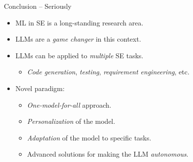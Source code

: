 \documentclass[presentation, 10pt]{beamer}\mode<presentation>{\usetheme{AMSBolognaFC}}
\begin{document}
\begin{frame}{Conclusion -- Seriously}
\begin{itemize}
	\item ML in SE is a long-standing research area.
	\item LLMs are a \emph{game changer} in this context.
	\item LLMs can be applied to \emph{multiple} SE tasks.
	\begin{itemize}
		\item \emph{Code generation}, \emph{testing}, \emph{requirement engineering}, etc.
	\end{itemize}
	\item Novel paradigm:
	\begin{itemize}
		\item \emph{One-model-for-all} approach.
		\item \emph{Personalization} of the model.
		\item \emph{Adaptation} of the model to specific tasks.
		\item Advanced solutions for making the LLM \emph{autonomous}.
	\end{itemize}
\end{itemize}
\end{frame}

\frame{\titlepage}

\section*{\refname}

\begin{frame}{\refname}
	\tiny
	\printbibliography
\end{frame}

\end{document}
